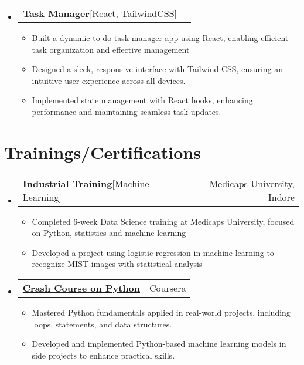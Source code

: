 \documentclass[letterpaper,11pt]{article}
\makeatletter
\newcommand{\resumeItem}[1]{
    \item\small{
      {#1 \vspace{-2pt}}
    }
  }
\newcommand{\resumeCertheading}[2]{
    \vspace{5pt}\item
      \begin{tabular*}{0.97\textwidth}[t]{l@{\extracolsep{\fill}}r}
        {#1} & #2 \\
      \end{tabular*}\vspace{-7pt}
  }
\newcommand{\resumeSubSubheading}[2]{
      \item
      \begin{tabular*}{0.97\textwidth}{l@{\extracolsep{\fill}}r}
        \textit{\small#1} & \textit{\small #2} \\
      \end{tabular*}\vspace{-7pt}
  }
\newcommand{\resumeProjectHeading}[2]{
      \item
      \begin{tabular*}{0.97\textwidth}{l@{\extracolsep{\fill}}r}
        \small#1 & #2 \\
      \end{tabular*}\vspace{-7pt}
  }
\newcommand{\resumeSubHeadingListStart}{\begin{itemize}[leftmargin=0.15in, label={}]}
\newcommand{\resumeSubHeadingListEnd}{\end{itemize}}
\newcommand{\resumeItemListStart}{\begin{itemize}}
\newcommand{\resumeItemListEnd}{\end{itemize}\vspace{-5pt}}
\makeatother
\begin{document}
\resumeSubHeadingListStart
\resumeProjectHeading
{\textbf{\href{https://github.com/shanutiwari1010/task-manager}{Task Manager}\hspace{5pt}}{{[React, TailwindCSS]}}}{}
\resumeItemListStart
\resumeItem{Built a dynamic to-do task manager app using React, enabling efficient task organization and effective management}
\resumeItem{Designed a sleek, responsive interface with Tailwind CSS, ensuring an intuitive user experience across all devices.}
\resumeItem{Implemented state management with React hooks, enhancing performance and maintaining seamless task updates.}

\resumeItemListEnd
\resumeSubHeadingListEnd

\section{Trainings/Certifications}
\resumeSubHeadingListStart

\resumeCertheading
{\textbf{\href{https://medicaps.ac.in/}{Industrial Training}\hspace{5pt}}{{[Machine Learning]}}}{Medicaps University, Indore}
\resumeItemListStart
\resumeItem{Completed 6-week Data Science training at Medicaps University, focused on Python, statistics and machine learning}
\resumeItem{Developed a project using logistic regression in machine learning to recognize MIST images with statistical analysis}
\resumeItemListEnd

\resumeCertheading
{\textbf{\href{https://coursera.org/verify/FHDUZAK7YL3Q}{Crash Course on Python}\hspace{3pt}}{{}}}{Coursera}
\resumeItemListStart
\resumeItem{Mastered Python fundamentals applied in real-world projects, including loops, statements, and data structures.}
\resumeItem{Developed and implemented Python-based machine learning models in side projects to enhance practical skills.}
\resumeItemListEnd
\resumeSubHeadingListEnd
\end{document}
